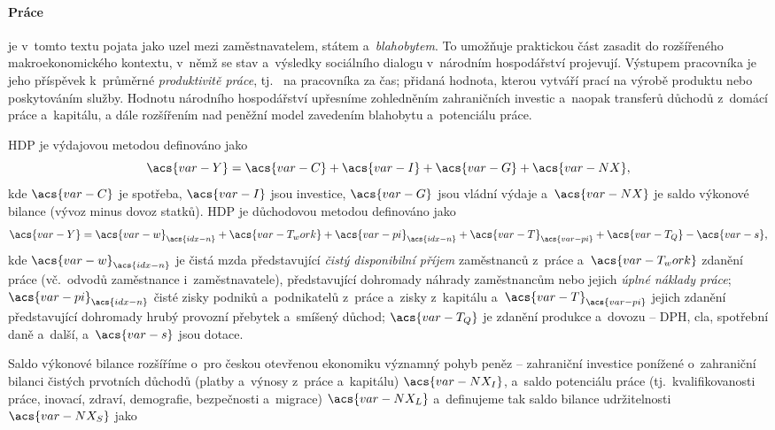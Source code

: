 \paragraph{Práce} je v~tomto textu pojata jako uzel mezi zaměstnavatelem, státem a~\textit{blahobytem}. To umožňuje praktickou část zasadit do rozšířeného makroekonomického kontextu, v~němž se stav a~výsledky sociálního dialogu v~národním hospodářství projevují. Výstupem pracovníka je jeho příspěvek k~průměrné \textit{produktivitě práce}, tj.~ na pracovníka za čas; přidaná hodnota, kterou vytváří prací na výrobě produktu nebo poskytováním služby. Hodnotu národního hospodářství upřesníme zohledněním zahraničních investic a~naopak transferů důchodů z~domácí práce a~kapitálu, a dále rozšířením nad peněžní model zavedením blahobytu a~potenciálu práce.\par
\Ac{HDP} je výdajovou metodou definováno jako
\begin{equation}
  \acs{var-Y} = \acs{var-C} + \acs{var-I} + \acs{var-G} + \acs{var-NX},
  \label{eq:hdp_vydaje}
\end{equation}
kde \(\acs{var-C}\) je spotřeba, \(\acs{var-I}\) jsou investice, \(\acs{var-G}\) jsou vládní výdaje a~\(\acs{var-NX}\) je saldo výkonové bilance (vývoz minus dovoz statků).
\Ac{HDP} je důchodovou metodou definováno jako
\begin{equation}
  \acs{var-Y} = \acs{var-w}_{\acs{idx-n}} + \acs{var-T_work} + \acs{var-pi}_{\acs{idx-n}} + \acs{var-T}_{\acs{var-pi}} + \acs{var-T_Q} - \acs{var-s},
  \label{eq:hdp_duchod}
\end{equation}
kde \(\acs{var-w}_{\acs{idx-n}}\) je čistá mzda představující \textit{čistý disponibilní příjem} zaměstnanců z~práce a~\(\acs{var-T_work}\) zdanění práce (vč.~odvodů zaměstnance i~zaměstnavatele), představující dohromady náhrady zaměstnancům nebo jejich \textit{úplné náklady práce}; \(\acs{var-pi}_{\acs{idx-n}}\) čisté zisky podniků a~podnikatelů z~práce a~zisky z~kapitálu a~\(\acs{var-T}_{\acs{var-pi}}\) jejich zdanění představující dohromady hrubý provozní přebytek a~smíšený důchod; \(\acs{var-T_Q}\) je zdanění produkce a~dovozu -- \ac{DPH}, cla, spotřební daně a~další, a~\(\acs{var-s}\) jsou dotace.\par
Saldo výkonové bilance rozšíříme o~pro českou otevřenou ekonomiku významný pohyb peněz -- zahraniční investice ponížené o~zahraniční bilanci čistých prvotních důchodů (platby a~výnosy z~práce a~kapitálu) \(\acs{var-NX_I}\), a~saldo potenciálu práce (tj.~kvalifikovanosti práce, inovací, zdraví, demografie, bezpečnosti a~migrace) \(\acs{var-NX_L}\) a~definujeme tak saldo bilance udržitelnosti \(\acs{var-NX_S}\) jako
